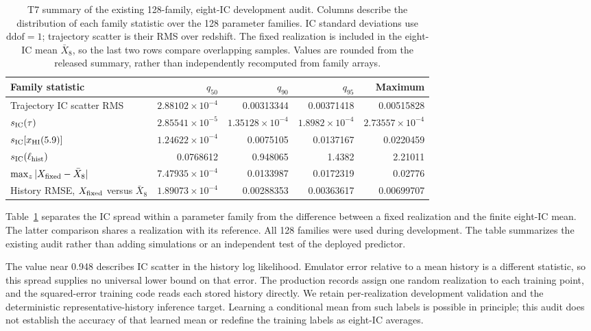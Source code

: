 \begin{table}[t]\centering\small
\caption{T7 summary of the existing 128-family, eight-IC development audit. Columns describe the distribution of each family statistic over the 128 parameter families. IC standard deviations use $\mathrm{ddof}=1$; trajectory scatter is their RMS over redshift. The fixed realization is included in the eight-IC mean $\bar X_8$, so the last two rows compare overlapping samples. Values are rounded from the released summary, rather than independently recomputed from family arrays.}\label{tab:t7-ic-summary}
\begin{tabular*}{\textwidth}{@{\extracolsep{\fill}}lrrrr}\toprule
Family statistic & $q_{50}$ & $q_{90}$ & $q_{95}$ & Maximum\\\midrule
Trajectory IC scatter RMS & $2.88102\times10^{-4}$ & 0.00313344 & 0.00371418 & 0.00515828\\
$s_{\rm IC}(\tau)$ & $2.85541\times10^{-5}$ & $1.35128\times10^{-4}$ & $1.8982\times10^{-4}$ & $2.73557\times10^{-4}$\\
$s_{\rm IC}[x_{\rm HI}(5.9)]$ & $1.24622\times10^{-4}$ & 0.0075105 & 0.0137167 & 0.0220459\\
$s_{\rm IC}(\ell_{\rm hist})$ & 0.0768612 & 0.948065 & 1.4382 & 2.21011\\
$\max_z|X_{\rm fixed}-\bar X_8|$ & $7.47935\times10^{-4}$ & 0.0133987 & 0.0172319 & 0.02776\\
History RMSE, $X_{\rm fixed}$ versus $\bar X_8$ & $1.89073\times10^{-4}$ & 0.00288353 & 0.00363617 & 0.00699707\\
\bottomrule\end{tabular*}\end{table}

Table~\ref{tab:t7-ic-summary} separates the IC spread within a parameter family from the difference between a fixed realization and the finite eight-IC mean. The latter comparison shares a realization with its reference. All 128 families were used during development. The table summarizes the existing audit rather than adding simulations or an independent test of the deployed predictor.

The value near 0.948 describes IC scatter in the history log likelihood. Emulator error relative to a mean history is a different statistic, so this spread supplies no universal lower bound on that error. The production records assign one random realization to each training point, and the squared-error training code reads each stored history directly. We retain per-realization development validation and the deterministic representative-history inference target. Learning a conditional mean from such labels is possible in principle; this audit does not establish the accuracy of that learned mean or redefine the training labels as eight-IC averages.

